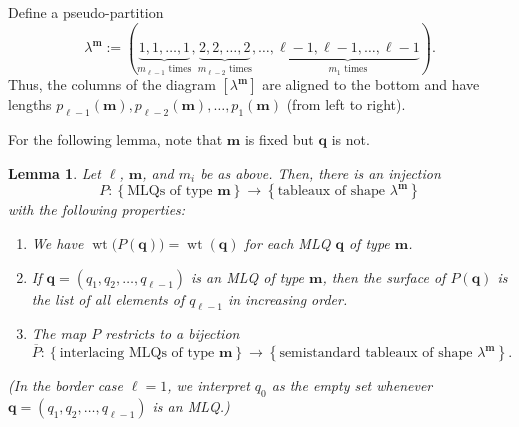\documentclass[reqno]{amsart}
\newcommand{\0}{\phantom{c}}
\newcommand{\diag}[1]{\left[#1\right]} %
\DeclareMathOperator{\wt}{wt} %
\newcommand{\mm}{\mathbf{m}}
\newcommand{\qq}{\mathbf{q}}
\newcommand{\NN}{\mathbb{N}}
\newcommand{\set}[1]{\left\{ #1 \right\}}
\newcommand{\tup}[1]{\left( #1 \right)}
\theoremstyle{plain}
\newtheorem{lemma}[thm]{Lemma}
\theoremstyle{definition}
\numberwithin{equation}{section}
\begin{document}
Define a pseudo-partition
\begin{equation}
\label{eq.determinant_form.interlacing.lam}
\lambda^{\mm} := (
  \underbrace{1,1,\ldots,1}_{m_{\ell-1}\text{ times}},
  \underbrace{2,2,\ldots,2}_{m_{\ell-2}\text{ times}},
  \ldots,
  \underbrace{\ell-1,\ell-1,\ldots,\ell-1}_{m_1\text{ times}}
).
\end{equation}
Thus, the columns of the diagram $\diag{\lambda^{\mm}}$ are aligned to the bottom and have lengths $p_{\ell-1}(\mm), p_{\ell-2}(\mm), \dotsc, p_1(\mm)$ (from left to right).

For the following lemma, note that $\mm$ is fixed but $\qq$ is not.

\begin{lemma}
\label{lem:determinant_form.bij1}
Let $\ell$, $\mm$, and $m_i$ be as above.
Then, there is an injection
\[
P \colon \set{ \text{MLQs of type } \mm } \to \set{ \text{tableaux of shape } \lambda^{\mm} }
\]
with the following properties:
\begin{enumerate}
\item[(a)] We have $\wt\bigl(  P(\qq) \bigr) = \wt(\qq)$ for each MLQ $\qq$ of type $\mm$.

\item[(b)] If $\qq = \tup{q_1, q_2, \dotsc, q_{\ell-1}}$ is an MLQ of type $\mm$, then the surface of $P(\qq)$ is the list of all elements of $q_{\ell-1}$ in increasing order.

\item[(c)] The map $P$ restricts to a bijection
\[
\overline{P} \colon \set{\text{interlacing MLQs of type } \mm}  \to \set{  \text{semistandard tableaux of shape } \lambda^{\mm}}.
\]
\end{enumerate}
(In the border case $\ell = 1$, we interpret $q_0$ as the empty set whenever $\qq = \tup{q_1, q_2, \dotsc, q_{\ell-1}}$ is an MLQ.)
\end{lemma}
\end{document}
